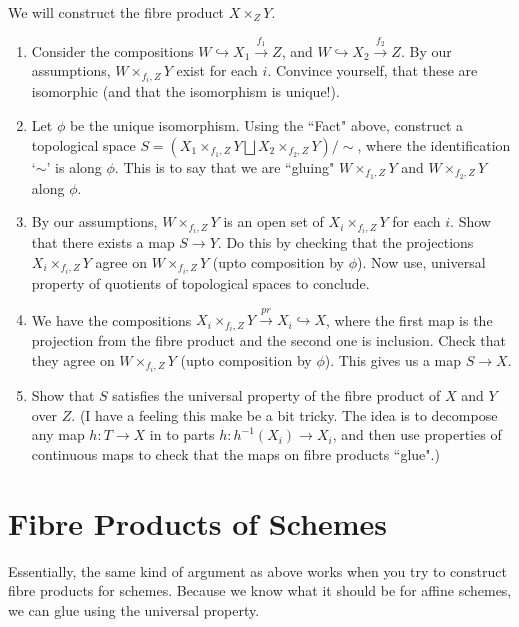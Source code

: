 \documentclass[10pt]{amsart}
\theoremstyle{definition}
\begin{document}
We will construct the fibre product $X\times_Z Y$.


\begin{enumerate}[resume]
	\item Consider the compositions $W\hookrightarrow X_1\overset{f_1}{\rightarrow} Z$, and $W\hookrightarrow X_2\overset{f_2}{\rightarrow} Z$. By our assumptions, $W\times_{f_i,Z}Y$ exist for each $i$. Convince yourself, that these are isomorphic (and that the isomorphism is unique!).
	\item Let $\phi$ be the unique isomorphism. Using the ``Fact" above, construct a topological space $S=(X_1\times_{f_1,Z}Y\bigsqcup X_2\times_{f_2,Z}Y)/\sim$, where the identification `$\sim$' is along $\phi$. This is to say that we are ``gluing" $W\times_{f_1,Z}Y$ and $W\times_{f_2,Z}Y$ along $\phi$.
	\item By our assumptions, $W\times_{f_i,Z}Y$ is an open set of $X_i\times_{f_i,Z}Y$ for each $i$. Show that there exists a map $S\rightarrow Y$. Do this by checking that the projections $X_i\times_{f_i,Z}Y$ agree on $W\times_{f_i,Z}Y$ (upto composition by $\phi$). Now use, universal property of quotients of topological spaces to conclude.
	\item We have the compositions $X_i\times_{f_i,Z}Y\overset{pr}{\rightarrow} X_i\hookrightarrow X$, where the first map is the projection from the fibre product and the second one is inclusion. Check that they agree on $W\times_{f_i,Z}Y$ (upto composition by $\phi$). This gives us a map $S\rightarrow X$.
	\item Show that $S$ satisfies the universal property of the fibre product of $X$ and $Y$ over $Z$. (I have a feeling this make be a bit tricky. The idea is to decompose any map $h:T\rightarrow X$ in to parts $h:h^{-1}(X_i)\rightarrow X_i$, and then use properties of continuous maps to check that the maps on fibre products ``glue".)
\end{enumerate}

\section{Fibre Products of Schemes}

Essentially, the same kind of argument as above works when you try to construct fibre products for schemes. Because we know what it should be for affine schemes, we can glue using the universal property.
\end{document}

